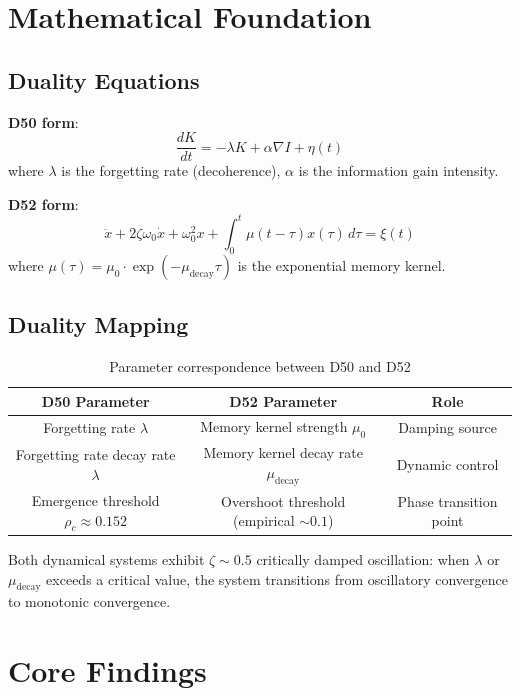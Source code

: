 \documentclass[12pt, a4paper]{article}
\begin{document}
\section{Mathematical Foundation}

\subsection{Duality Equations}

\textbf{D50 form}:
\begin{equation}
\frac{dK}{dt} = -\lambda K + \alpha \nabla I + \eta(t)
\end{equation}
where $\lambda$ is the forgetting rate (decoherence), $\alpha$ is the information gain intensity.

\textbf{D52 form}:
\begin{equation}
\ddot{x} + 2\zeta\omega_0 \dot{x} + \omega_0^2 x + \int_0^{t} \mu(t-\tau) x(\tau)\,d\tau = \xi(t)
\end{equation}
where $\mu(\tau) = \mu_0 \cdot \exp(-\mu_{\text{decay}} \tau)$ is the exponential memory kernel.

\subsection{Duality Mapping}

\begin{table}[h]
\centering
\begin{tabular}{c c c}
\toprule
D50 Parameter & D52 Parameter & Role \\
\midrule
Forgetting rate $\lambda$ & Memory kernel strength $\mu_0$ & Damping source \\
Forgetting rate decay rate $\lambda$ & Memory kernel decay rate $\mu_{\text{decay}}$ & Dynamic control \\
Emergence threshold $\rho_c \approx 0.152$ & Overshoot threshold (empirical $\sim\!0.1$) & Phase transition point \\
\bottomrule
\end{tabular}
\caption{Parameter correspondence between D50 and D52}
\end{table}

Both dynamical systems exhibit $\zeta \sim 0.5$ critically damped oscillation: when $\lambda$ or $\mu_{\text{decay}}$ exceeds a critical value, the system transitions from oscillatory convergence to monotonic convergence.

\section{Core Findings}
\end{document}

